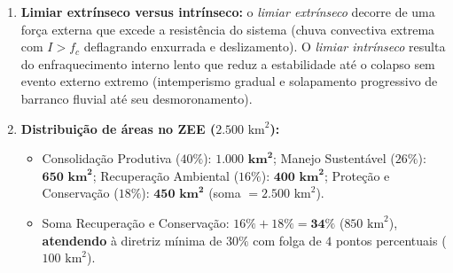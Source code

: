 \begin{boxGabarito}
\begin{enumerate}[leftmargin=1.8em, itemsep=4pt]
    \item \textbf{Limiar extrínseco versus intrínseco:} o \emph{limiar extrínseco} decorre de uma força externa que excede a resistência do sistema (chuva convectiva extrema com $I > f_c$ deflagrando enxurrada e deslizamento). O \emph{limiar intrínseco} resulta do enfraquecimento interno lento que reduz a estabilidade até o colapso sem evento externo extremo (intemperismo gradual e solapamento progressivo de barranco fluvial até seu desmoronamento).

    \item \textbf{Distribuição de áreas no ZEE ($2.500\text{ km}^2$):}
    \begin{itemize}[leftmargin=1.4em, itemsep=1pt]
      \item Consolidação Produtiva ($40\%$): $\mathbf{1.000\text{ km}^2}$; Manejo Sustentável ($26\%$): $\mathbf{650\text{ km}^2}$; Recuperação Ambiental ($16\%$): $\mathbf{400\text{ km}^2}$; Proteção e Conservação ($18\%$): $\mathbf{450\text{ km}^2}$ (soma $= 2.500\text{ km}^2$).
      \item Soma Recuperação e Conservação: $16\% + 18\% = \mathbf{34\%}$ ($850\text{ km}^2$), \textbf{atendendo} à diretriz mínima de $30\%$ com folga de $4$ pontos percentuais ($100\text{ km}^2$).
    \end{itemize}
  \end{enumerate}
\end{boxGabarito}

